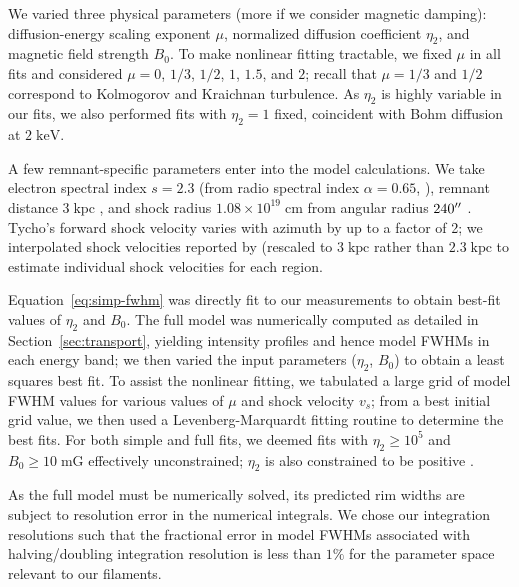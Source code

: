 \documentclass[iop, apj, numberedappendix, twocolappendix]{emulateapj}
\newcommand*{\mt}{\mathrm}
\newcommand*{\unit}[1]{\;\mt{#1}}  %
\begin{document}
We varied three physical parameters (more if we consider magnetic damping):
diffusion-energy scaling exponent $\mu$, normalized diffusion
coefficient $\eta_2$, and magnetic field strength $B_0$.
To make nonlinear fitting tractable, we fixed $\mu$ in all fits and considered
$\mu = 0$, $1/3$, $1/2$, $1$, $1.5$, and $2$;
recall that $\mu = 1/3$ and $1/2$ correspond to Kolmogorov and Kraichnan turbulence.
As $\eta_2$ is highly variable in our fits, we also performed
fits with $\eta_2 = 1$ fixed, coincident with Bohm diffusion at $2 \unit{keV}$.

A few remnant-specific parameters enter into the model calculations.  We take
electron spectral index $s = 2.3$ (from radio spectral index $\alpha = 0.65$,
\citet{kothes2006} ),
remnant distance $3 \unit{kpc}$ \citep[cf.][]{hayato2010}, and
shock radius $1.08 \times 10^{19} \unit{cm}$ from angular radius $240\mbox{$^{\prime\prime}$}$
\citep{green2009}.  Tycho's forward shock velocity varies with azimuth by up to
a factor of 2; we interpolated shock velocities reported by
\citet{williams2013} (rescaled to $3 \unit{kpc}$ rather than $2.3 \unit{kpc}$
to estimate individual shock velocities for each region.

Equation~\eqref{eq:simp-fwhm} was directly fit to our measurements to obtain
best-fit values of $\eta_2$ and $B_0$.
The full model was numerically computed as detailed in
Section~\ref{sec:transport}, yielding intensity profiles and hence model FWHMs
in each energy band; we then varied the input parameters ($\eta_2$, $B_0$) to
obtain a least squares best fit.
To assist the nonlinear fitting, we tabulated a large grid of model FWHM values
for various values of $\mu$ and shock velocity $v_s$; from a best initial grid
value, we then used a Levenberg-Marquardt fitting routine to determine the best
fits.
For both simple and full fits, we deemed fits with $\eta_2 \geq 10^5$ and $B_0
\geq 10 \unit{mG}$ effectively unconstrained; $\eta_2$ is also constrained to
be positive .

As the full model must be numerically solved, its predicted rim widths are
subject to resolution error in the numerical integrals.  We chose our
integration resolutions such that the fractional error in model FWHMs
associated with halving/doubling integration resolution is less than $1\%$ for
the parameter space relevant to our filaments.
\end{document}
